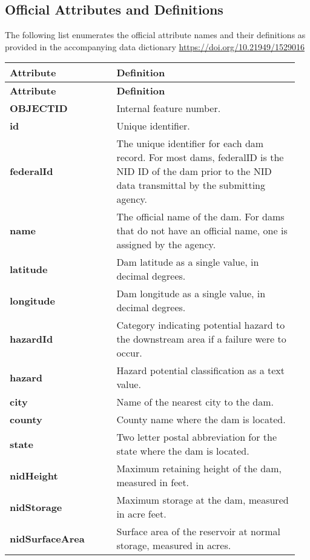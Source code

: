 \documentclass{article}
\begin{document}
\subsection*{Official Attributes and Definitions}
The following list enumerates the official attribute names and their definitions as provided in the accompanying data dictionary \href{ https://doi.org/10.21949/1529016}{https://doi.org/10.21949/1529016}

\begin{longtable}{p{0.35\linewidth} p{0.6\linewidth}}
\hline
\textbf{Attribute} & \textbf{Definition} \\
\hline
\endfirsthead
\hline
\textbf{Attribute} & \textbf{Definition} \\
\hline
\endhead
\hline
\endfoot
\textbf{OBJECTID} & Internal feature number. \\\hline
\textbf{id} & Unique identifier. \\\hline
\textbf{federalId} & The unique identifier for each dam record. For most dams, federalID is the NID ID of the dam prior to the NID data transmittal by the submitting agency. \\\hline
\textbf{name} & The official name of the dam. For dams that do not have an official name, one is assigned by the agency. \\\hline
\textbf{latitude} & Dam latitude as a single value, in decimal degrees. \\\hline
\textbf{longitude} & Dam longitude as a single value, in decimal degrees. \\\hline
\textbf{hazardId} & Category indicating potential hazard to the downstream area if a failure were to occur. \\\hline
\textbf{hazard} & Hazard potential classification as a text value. \\\hline
\textbf{city} & Name of the nearest city to the dam. \\\hline
\textbf{county} & County name where the dam is located. \\\hline
\textbf{state} & Two letter postal abbreviation for the state where the dam is located. \\\hline
\textbf{nidHeight} & Maximum retaining height of the dam, measured in feet. \\\hline
\textbf{nidStorage} & Maximum storage at the dam, measured in acre feet. \\\hline
\textbf{nidSurfaceArea} & Surface area of the reservoir at normal storage, measured in acres. \\\hline

\end{longtable}
\end{document}

